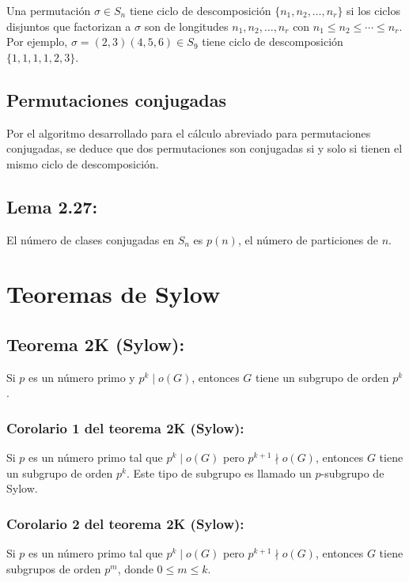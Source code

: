\documentclass{article}
\begin{document}
Una permutación $\sigma\in S_n$ tiene ciclo de descomposición $\{n_1,n_2,\ldots,n_r\}$ si los ciclos disjuntos que factorizan a $\sigma$ son de longitudes  $n_1,n_2,\ldots,n_r$ con $n_1\leq n_2\leq\cdots\leq n_r$. Por ejemplo, $\sigma=(2,3)(4,5,6)\in S_9$ tiene ciclo de descomposición $\{1,1,1,1,2,3\}$.

\subsection*{\color{purple} Permutaciones conjugadas}

Por el algoritmo desarrollado para el cálculo abreviado para permutaciones conjugadas, se deduce que dos permutaciones son conjugadas si y solo si tienen el mismo ciclo de descomposición.

\subsection*{\color{blue} Lema 2.27:}

El número de clases conjugadas en $S_n$ es $p(n)$, el número de particiones de $n$.

\newpage
\section{Teoremas de Sylow}

\subsection*{\color{red} Teorema 2K (Sylow):}

Si $p$ es un número primo y $p^k\mid o(G)$, entonces $G$ tiene un subgrupo de orden $p^k$.

\subsubsection*{\color{red} Corolario 1 del teorema 2K (Sylow):}

Si $p$ es un número primo tal que $p^k\mid o(G)$ pero $p^{k+1}\nmid o(G)$, entonces $G$ tiene un subgrupo de orden $p^k$. Este tipo de subgrupo es llamado un $p$-subgrupo de Sylow.

\subsubsection*{\color{red} Corolario 2 del teorema 2K (Sylow):}

Si $p$ es un número primo tal que $p^k\mid o(G)$ pero $p^{k+1}\nmid o(G)$, entonces $G$ tiene subgrupos de orden $p^m$, donde $0\leq m\leq k$.
\end{document}
